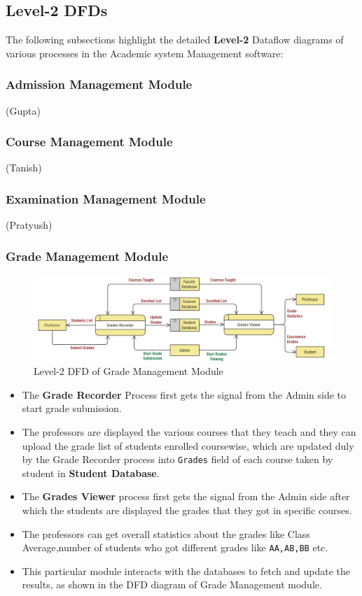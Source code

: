 \documentclass[12pt,a4paper]{article}
\begin{document}
\subsection{Level-2 DFDs}
The following subsections highlight the detailed \textbf{Level-2} Dataflow diagrams of various processes in the Academic system Management software:
\subsubsection{Admission Management Module}
(Gupta)
\subsubsection{Course Management Module}
(Tanish)
\subsubsection{Examination Management Module}
(Pratyush)
\subsubsection{Grade Management Module}
\begin{figure}[hbt!]
    \centering
        \includegraphics[width=\linewidth]{Grade_Management_DFD.png} 
    \caption{Level-2 DFD of Grade Management Module}
\end{figure}
\begin{itemize}
    \item The \textbf{Grade Recorder} Process first gets the signal from the Admin side to start grade submission.
    \item The professors are displayed the various courses that they teach and they can upload the grade list of students enrolled coursewise, which are updated duly by the Grade Recorder process into \texttt{Grades} field of each course taken by student in \textbf{Student Database}.
    \item The \textbf{Grades Viewer} process first gets the signal from the Admin side after which the students are displayed the grades that they got in specific courses.
    \item The professors can get overall statistics about the grades like Class Average,number of students who got different grades like \texttt{AA,AB,BB} etc.
    \item This particular module interacts with the databases to fetch and update the results, as shown in the DFD diagram of Grade Management module.
\end{itemize}
\end{document}
